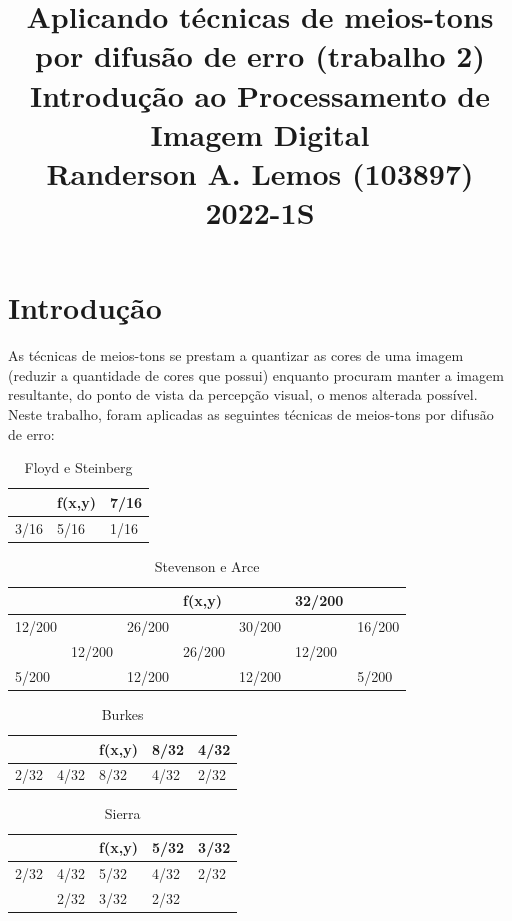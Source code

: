 \documentclass{article}
\title{
	Aplicando técnicas de meios-tons por difusão de erro (trabalho 2) \\
	\Large Introdução ao Processamento de Imagem Digital \\
	Randerson A. Lemos (103897)
	2022-1S
}
\date{\vspace{-5ex}}
\begin{document}
  \maketitle

%
\section{Introdução}
As técnicas de meios-tons se prestam a quantizar as cores de uma imagem (reduzir a quantidade de cores que possui) enquanto procuram manter a imagem resultante, do ponto de vista da percepção visual, o menos alterada possível. Neste trabalho, foram aplicadas as seguintes técnicas de meios-tons por difusão de erro:

\begin{table}[h]
	\caption*{Floyd e Steinberg}
	\label{tab:floyd}
	\centering
	\begin{tabular}{|l|l|l|}
		\hline
		& f(x,y) & 7/16 \\ \hline
		3/16 & 5/16   & 1/16 \\ \hline
	\end{tabular}
\end{table}

\begin{table}[h]
	\caption*{Stevenson e Arce}
	\label{tab:stevenson}
	\centering
	\begin{tabular}{|l|l|l|l|l|l|l|}
		\hline
		&        &        & f(x,y) &        & 32/200 &        \\ \hline
		12/200 &        & 26/200 &        & 30/200 &        & 16/200 \\ \hline
		& 12/200 &        & 26/200 &        & 12/200 &        \\ \hline
		5/200  &        & 12/200 &        & 12/200 &        & 5/200  \\ \hline
	\end{tabular}
\end{table}

\begin{table}[h]
	\caption*{Burkes}
	\label{tab:burkers}
	\centering
	\begin{tabular}{|l|l|l|l|l|}
		\hline
		&      & f(x,y) & 8/32 & 4/32 \\ \hline
		2/32 & 4/32 & 8/32   & 4/32 & 2/32 \\ \hline
	\end{tabular}
\end{table}

\begin{table}[!h]
	\caption*{Sierra}
	\label{tab:sierra}
	\centering
	\begin{tabular}{|l|l|l|l|l|}
		\hline
		&      & f(x,y) & 5/32 & 3/32 \\ \hline
		2/32 & 4/32 & 5/32   & 4/32 & 2/32 \\ \hline
		& 2/32 & 3/32   & 2/32 &      \\ \hline
	\end{tabular}
\end{table}
\end{document}
